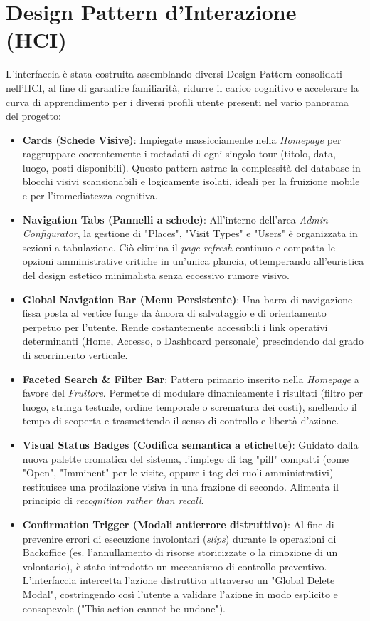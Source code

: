 \section{Design Pattern d'Interazione (HCI)}
L'interfaccia è stata costruita assemblando diversi Design Pattern consolidati nell'HCI, al fine di garantire familiarità, ridurre il carico cognitivo e accelerare la curva di apprendimento per i diversi profili utente presenti nel vario panorama del progetto:
\begin{itemize}
    \item \textbf{Cards (Schede Visive)}: Impiegate massicciamente nella \textit{Homepage} per raggruppare coerentemente i metadati di ogni singolo tour (titolo, data, luogo, posti disponibili). Questo pattern astrae la complessità del database in blocchi visivi scansionabili e logicamente isolati, ideali per la fruizione mobile e per l'immediatezza cognitiva.
    \item \textbf{Navigation Tabs (Pannelli a schede)}: All'interno dell'area \textit{Admin Configurator}, la gestione di "Places", "Visit Types" e "Users" è organizzata in sezioni a tabulazione. Ciò elimina il \textit{page refresh} continuo e compatta le opzioni amministrative critiche in un'unica plancia, ottemperando all'euristica del design estetico minimalista senza eccessivo rumore visivo.
    \item \textbf{Global Navigation Bar (Menu Persistente)}: Una barra di navigazione fissa posta al vertice funge da àncora di salvataggio e di orientamento perpetuo per l'utente. Rende costantemente accessibili i link operativi determinanti (Home, Accesso, o Dashboard personale) prescindendo dal grado di scorrimento verticale.
    \item \textbf{Faceted Search \& Filter Bar}: Pattern primario inserito nella \textit{Homepage} a favore del \textit{Fruitore}. Permette di modulare dinamicamente i risultati (filtro per luogo, stringa testuale, ordine temporale o scrematura dei costi), snellendo il tempo di scoperta e trasmettendo il senso di controllo e libertà d'azione.
    \item \textbf{Visual Status Badges (Codifica semantica a etichette)}: Guidato dalla nuova palette cromatica del sistema, l'impiego di tag "pill" compatti (come "Open", "Imminent" per le visite, oppure i tag dei ruoli amministrativi) restituisce una profilazione visiva in una frazione di secondo. Alimenta il principio di \textit{recognition rather than recall}.
    \item \textbf{Confirmation Trigger (Modali antierrore distruttivo)}: Al fine di prevenire errori di esecuzione involontari (\textit{slips}) durante le operazioni di Backoffice (es. l'annullamento di risorse storicizzate o la rimozione di un volontario), è stato introdotto un meccanismo di controllo preventivo. L'interfaccia intercetta l'azione distruttiva attraverso un "Global Delete Modal", costringendo così l'utente a validare l'azione in modo esplicito e consapevole ("This action cannot be undone").

\end{itemize}
